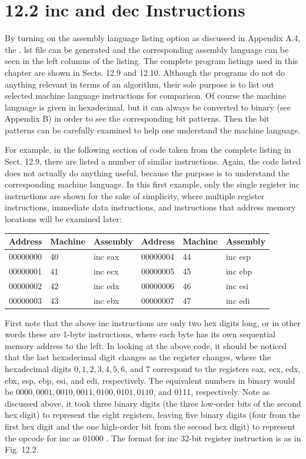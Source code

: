 \documentclass[10pt]{book}
\begin{document}
\section*{12.2 inc and dec Instructions}
By turning on the assembly language listing option as discussed in Appendix A.4, the . lst file can be generated and the corresponding assembly language can be seen in the left columns of the listing. The complete program listings used in this chapter are shown in Sects. 12.9 and 12.10. Although the programs do not do anything relevant in terms of an algorithm, their sole purpose is to list out selected machine language instructions for comparison. Of course the machine language is given in hexadecimal, but it can always be converted to binary (see Appendix B) in order to see the corresponding bit patterns. Then the bit patterns can be carefully examined to help one understand the machine language.

For example, in the following section of code taken from the complete listing in Sect. 12.9, there are listed a number of similar instructions. Again, the code listed does not actually do anything useful, because the purpose is to understand the corresponding machine language. In this first example, only the single register inc instructions are shown for the sake of simplicity, where multiple register instructions, immediate data instructions, and instructions that address memory locations will be examined later:

\begin{center}
\begin{tabular}{|l|l|l|l|l|l|}
\hline
Address & Machine & Assembly & Address & Machine & Assembly \\
\hline
00000000 & 40 & inc eax & 00000004 & 44 & inc esp \\
\hline
00000001 & 41 & inc ecx & 00000005 & 45 & inc ebp \\
\hline
00000002 & 42 & inc edx & 00000006 & 46 & inc esi \\
\hline
00000003 & 43 & inc ebx & 00000007 & 47 & inc edi \\
\hline
\end{tabular}
\end{center}

First note that the above inc instructions are only two hex digits long, or in other words these are 1-byte instructions, where each byte has its own sequential memory address to the left. In looking at the above code, it should be noticed that the last hexadecimal digit changes as the register changes, where the hexadecimal digits $0,1,2,3,4,5,6$, and 7 correspond to the registers eax, ecx, edx, ebx, esp, ebp, esi, and edi, respectively. The equivalent numbers in binary would be $0000,0001,0010,0011,0100,0101,0110$, and 0111, respectively. Note as discussed above, it took three binary digits (the three low-order bits of the second hex digit) to represent the eight registers, leaving five binary digits (four from the first hex digit and the one high-order bit from the second hex digit) to represent the opcode for inc as 01000 . The format for inc 32-bit register instruction is as in Fig. 12.2.
\end{document}
